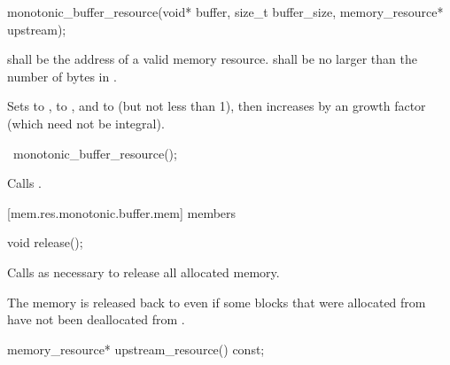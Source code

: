 %
\begin{itemdecl}
monotonic_buffer_resource(void* buffer, size_t buffer_size, memory_resource* upstream);
\end{itemdecl}

\begin{itemdescr}
\pnum
\requires
{} shall be the address of a valid memory resource.
 shall be no larger than the number of bytes in .

\pnum
\effects
Sets  to ,
 to , and
 to  (but not less than 1),
then increases 
by an  growth factor (which need not be integral).
\end{itemdescr}

%
\begin{itemdecl}
~monotonic_buffer_resource();
\end{itemdecl}

\begin{itemdescr}
\pnum
\effects
Calls .
\end{itemdescr}


[mem.res.monotonic.buffer.mem]{ members}

%
\begin{itemdecl}
void release();
\end{itemdecl}

\begin{itemdescr}
\pnum
\effects
Calls  as necessary
to release all allocated memory.

\pnum
\begin{note}
The memory is released back to 
even if some blocks that were allocated from 
have not been deallocated from .\end{note}
\end{itemdescr}

%
\begin{itemdecl}
memory_resource* upstream_resource() const;
\end{itemdecl}

